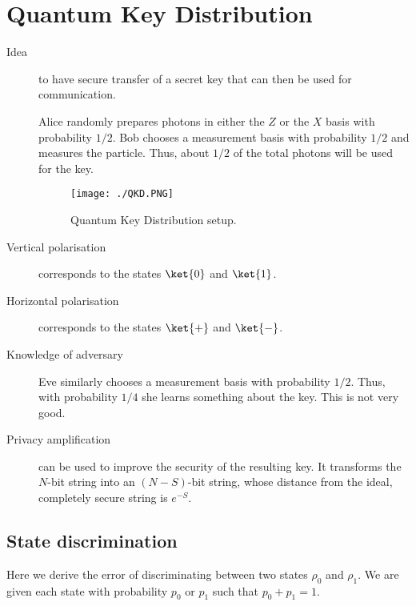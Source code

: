 \section{Quantum Key Distribution}
\begin{description}
\item[Idea] to have secure transfer of a secret key that can then be used for communication. 

Alice randomly prepares photons in either the $Z$ or the $X$ basis with probability $1/2$. Bob chooses a measurement basis with probability $1/2$ and measures the particle. Thus, about $1/2$ of the total photons will be used for the key. 

\begin{figure}[h]
\centering
\texttt{[image: ./QKD.PNG]}
\caption{Quantum Key Distribution setup.}
\end{figure}


\item[Vertical polarisation] corresponds to the states $\ket{0}$ and $\ket{1}$. 

\item[Horizontal polarisation] corresponds to the states $\ket{+}$ and $\ket{-}$. 

\item[Knowledge of adversary] Eve similarly chooses a measurement basis with probability $1/2$. Thus, with probability $1/4$ she learns something about the key. This is not very good. 


\item[Privacy amplification] can be used to improve the security of the resulting key. It transforms the $N$-bit string into an $(N-S)$-bit string, whose distance from the ideal, completely secure string is $e^{-S}$. 

\end{description}
\subsection{State discrimination}
Here we derive the error of discriminating between two states $\rho_0$ and $\rho_1$. We are given each state with probability $p_0$ or $p_1$ such that $p_0 + p_1 = 1$. 

